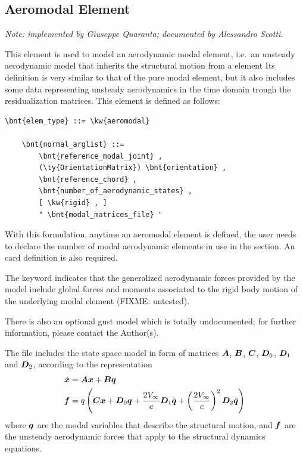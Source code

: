 \subsection{Aeromodal Element}
\emph{Note: implemented by Giuseppe Quaranta; documented by Alessandro Scotti.}

\noindent
This element is used to model an aerodynamic modal element,
i.e.\ an unsteady aerodynamic model that inherits the structural 
motion from a   element
Its definition is very similar to that of the pure modal element, 
but it also includes some data representing unsteady aerodynamics 
in the time domain trough the residualization matrices.
This element is defined as follows:
\begin{Verbatim}[commandchars=\\\{\}]
    \bnt{elem_type} ::= \kw{aeromodal}

    \bnt{normal_arglist} ::= 
        \bnt{reference_modal_joint} ,
        (\ty{OrientationMatrix}) \bnt{orientation} ,
        \bnt{reference_chord} ,
        \bnt{number_of_aerodynamic_states} ,
        [ \kw{rigid} , ]
        " \bnt{modal_matrices_file} "
\end{Verbatim}
With this formulation, anytime an aeromodal element is defined, 
the user needs to declare the number of modal aerodynamic elements 
in use in the  section.
An 
card definition is also required.

The keyword  indicates that the generalized aerodynamic forces
provided by the model include global forces and moments associated 
to the rigid body motion of the underlying modal element (FIXME: untested).

There is also an optional gust model which is totally undocumented;
for further information, please contact the Author(s).

The  file includes the state space model in form 
of matrices $\boldsymbol{A}$, $\boldsymbol{B}$, $\boldsymbol{C}$, $\boldsymbol{D}_0$, $\boldsymbol{D}_1$ and $\boldsymbol{D}_2$,
according to the representation
\begin{align*}
	\dot{\boldsymbol{x}} &= \boldsymbol{A}\boldsymbol{x} + \boldsymbol{B}\boldsymbol{q} \\	
	\boldsymbol{f} &= q\left( \boldsymbol{C}\boldsymbol{x} + \boldsymbol{D}_0 \boldsymbol{q} + \frac{2V_{\infty}}{c} \boldsymbol{D}_1 \dot{\boldsymbol{q}} + \left( \frac{2V_{\infty}}{c} \right)^2 \boldsymbol{D}_2 \ddot{\boldsymbol{q}} \right)
\end{align*}
where $\boldsymbol{q}$ are the modal variables that describe the structural motion,
and $\boldsymbol{f}$ are the unsteady aerodynamic forces that apply to the structural
dynamics equations.

